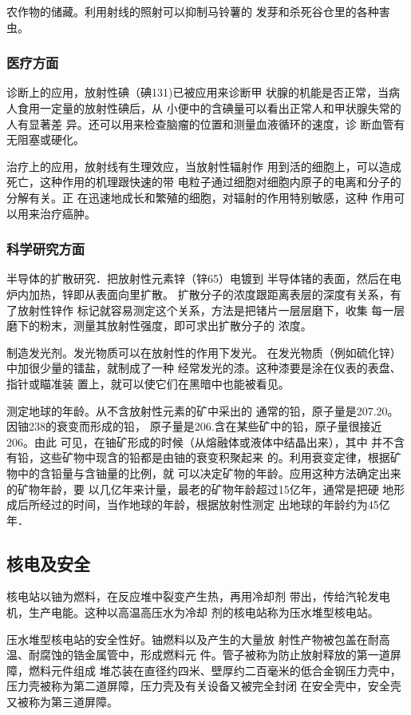 农作物的储藏。利用射线的照射可以抑制马铃薯的
发芽和杀死谷仓里的各种害虫。

\subsubsection{医疗方面}
诊断上的应用，放射性碘（碘131)已被应用来诊断甲
状腺的机能是否正常，当病人食用一定量的放射性碘后，从
小便中的含碘量可以看出正常人和甲状腺失常的人有显著差
异。还可以用来检查脑瘤的位置和测量血液循环的速度，诊
断血管有无阻塞或硬化。

治疗上的应用，放射线有生理效应，当放射性辐射作
用到活的细胞上，可以造成死亡，这种作用的机理跟快速的带
电粒子通过细胞对细胞内原子的电离和分子的分解有关。正
在迅速地成长和繁殖的细胞，对辐射的作用特别敏感，这种
作用可以用来治疗癌肿。

\subsubsection{科学研究方面}

半导体的扩散研究．把放射性元素锌（锌65）电镀到
半导体锗的表面，然后在电炉内加热，锌即从表面向里扩散。
扩散分子的浓度跟距离表层的深度有关系，有了放射性锌作
标记就容易测定这个关系，方法是把锗片一层层磨下，收集
每一层磨下的粉末，测量其放射性强度，即可求出扩散分子的
浓度。

制造发光剂。发光物质可以在放射性的作用下发光。
在发光物质（例如硫化锌）中加很少量的镭盐，就制成了一种
经常发光的漆。这种漆要是涂在仪表的表盘、指针或瞄准装
置上，就可以使它们在黑暗中也能被看见。

测定地球的年龄。从不含放射性元素的矿中采出的
通常的铅，原子量是207.20。因铀238的衰变而形成的铅，
原子量是206.含在某些矿中的铅，原子量很接近206。由此
可见，在铀矿形成的时候（从熔融体或液体中结晶出来），其中
并不含有铅，这些矿物中现含的铅都是由铀的衰变积聚起来
的。利用衰变定律，根据矿物中的含铅量与含铀量的比例，就
可以决定矿物的年龄。应用这种方法确定出来的矿物年龄，要
以几亿年来计量，最老的矿物年龄超过15亿年，通常是把硬
地形成后所经过的时间，当作地球的年龄，根据放射性测定
出地球的年龄约为45亿年．

\subsection{核电及安全}
核电站以铀为燃料，在反应堆中裂变产生热，再用冷却剂
带出，传给汽轮发电机，生产电能。这种以高温高压水为冷却
剂的核电站称为压水堆型核电站。

压水堆型核电站的安全性好。铀燃料以及产生的大量放
射性产物被包盖在耐高温、耐腐蚀的锆金属管中，形成燃料元
件。管子被称为防止放射释放的第一道屏障，燃料元件组成
堆芯装在直径约四米、壁厚约二百毫米的低合金钢压力壳中，
压力壳被称为第二道屏障，压力壳及有关设备又被完全封闭
在安全壳中，安全壳又被称为第三道屏障。


